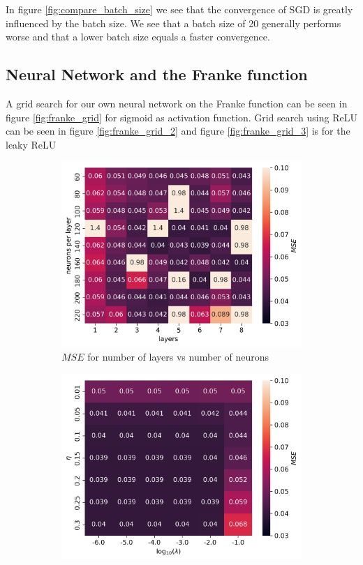 \documentclass[11pt]{article}
\begin{document}
In figure \ref{fig:compare_batch_size} we see that the convergence of SGD is greatly influenced by the batch size. We see that a batch size of 20 generally performs worse and that a lower batch size equals a faster convergence.

\subsection{Neural Network and the Franke function}
A grid search for our own neural network on the Franke function can be seen in figure \ref{fig:franke_grid} for sigmoid as activation function. Grid search using ReLU can be seen in figure \ref{fig:franke_grid_2} and figure \ref{fig:franke_grid_3} is for the leaky ReLU
\begin{figure}[H]
  \begin{subfigure}{.5\textwidth}
    \centering
    \includegraphics[width=\textwidth]{../figures/franke_L_n_test_sigmoid.png}
    \caption{$MSE$ for number of layers vs number of neurons}
    \label{fig:}
  \end{subfigure}
  \begin{subfigure}{.5\textwidth}
    \centering
    \includegraphics[width=\textwidth]{../figures/franke_eta_lmb_sigmoid.png}

\end{subfigure}
\end{figure}
\end{document}
